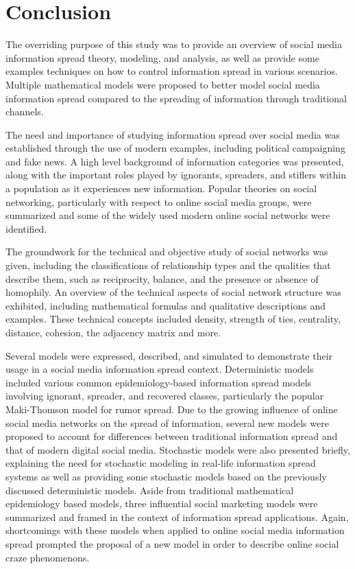 \chapter{Conclusion}
The overriding purpose of this study was to provide an overview of social media information spread theory, modeling, and analysis, as well as provide some examples techniques on how to control information spread in various scenarios. Multiple mathematical models were proposed to better model social media information spread compared to the spreading of information through traditional channels.

The need and importance of studying information spread over social media was established through the use of modern examples, including political campaigning and fake news. A high level background of information categories was presented, along with the important roles played by ignorants, spreaders, and stiflers within a population as it experiences new information. Popular theories on social networking, particularly with respect to online social media groups, were summarized and some of the widely used modern online social networks were identified.

The groundwork for the technical and objective study of social networks was given, including the classifications of relationship types and the qualities that describe them, such as reciprocity, balance, and the presence or absence of homophily. An overview of the technical aspects of social network structure was exhibited, including mathematical formulas and qualitative descriptions and examples. These technical concepts included density, strength of ties, centrality, distance, cohesion, the adjacency matrix and more. 

Several models were expressed, described, and simulated to demonstrate their usage in a social media information spread context. Deterministic models included various common epidemiology-based information spread models involving ignorant, spreader, and recovered classes, particularly the popular Maki-Thomson model for rumor spread. Due to the growing influence of online social media networks on the spread of information, several new models were proposed to account for differences between traditional information spread and that of modern digital social media. Stochastic models were also presented briefly, explaining the need for stochastic modeling in real-life information spread systems as well as providing some stochastic models based on the previously discussed deterministic models. Aside from traditional mathematical epidemiology based models, three influential social marketing models were summarized and framed in the context of information spread applications. Again, shortcomings with these models when applied to online social media information spread prompted the proposal of a new model in order to describe online social craze phenomenons.

